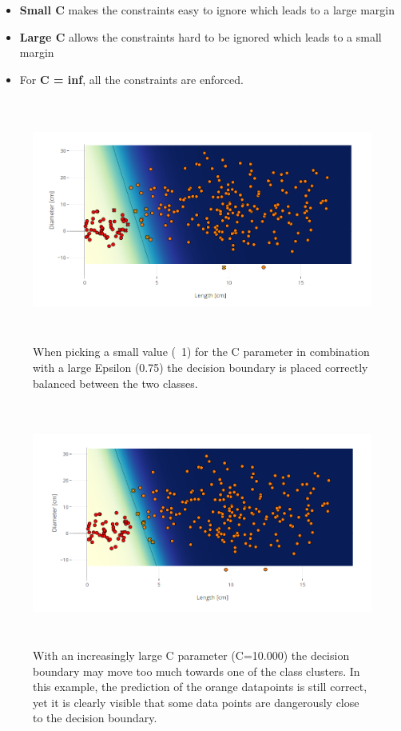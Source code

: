 \documentclass{scrartcl}
\begin{document}
\begin{itemize}
	\item \textbf{Small C} makes the constraints easy to ignore which leads to a large margin
	\item \textbf{Large C} allows the constraints hard to be ignored which leads to a small margin
	\item For \textbf{C = inf}, all the constraints are enforced.
\end{itemize}

\begin{figure}
	\centering
	\includegraphics[height=8cm]{SalmonLin75_1}
	\caption{When picking a small value (~1) for the C parameter in combination with a large Epsilon (0.75) the decision boundary is placed correctly balanced between the two classes.}
	\label{fig:example}%
\end{figure}

\begin{figure}
	\centering
	\includegraphics[height=8cm]{SalmonLin75_10k}
	\caption{With an increasingly large C parameter (C=10.000) the decision boundary may move too much towards one of the class clusters. In this example, the prediction of the orange datapoints is still correct, yet it is clearly visible that some data points are dangerously close to the decision boundary.}%
	\label{fig:example}%
\end{figure}
\end{document}
